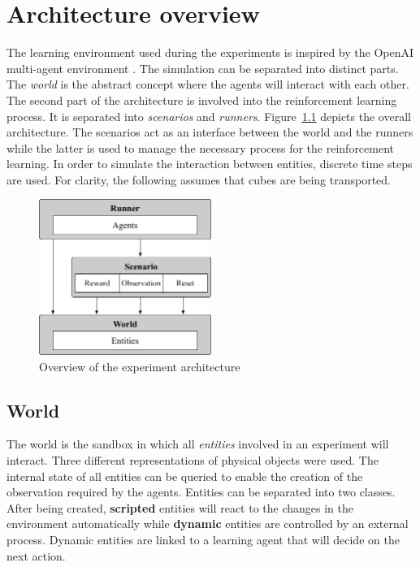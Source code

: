 \chapter{Architecture overview}
\label{app:arch-overview}	

The learning environment used during the experiments is inspired by the OpenAI multi-agent environment \cite{lowe_multi-agent_2017}. The simulation can be separated into distinct parts. The \textit{world} is the abstract concept where the agents will interact with each other. The second part of the architecture is involved into the reinforcement learning process. It is separated into \textit{scenarios} and \textit{runners}. Figure~\ref{fig:architecture-overview} depicts the overall architecture. The scenarios act as an interface between the world and the runners while the latter is used to manage the necessary process for the reinforcement learning. In order to simulate the interaction between entities, discrete time steps are used. For clarity, the following assumes that cubes are being transported.

\begin{figure}[h!]
\centering
\includegraphics[width=0.5\textwidth]{imgs/architecture-overview.png}
\caption[Overview of the experiment architecture]{Overview of the experiment architecture}
\label{fig:architecture-overview}
\end{figure}

\section{World}

The world is the sandbox in which all \textit{entities} involved in an experiment will interact. Three different representations of physical objects were used. The internal state of all entities can be queried to enable the creation of the observation required by the agents. Entities can be separated into two classes. After being created, \textbf{scripted} entities will react to the changes in the environment automatically while \textbf{dynamic} entities are controlled by an external process. Dynamic entities are linked to a learning agent that will decide on the next action.   

